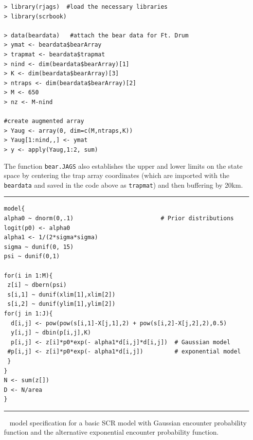 \begin{verbatim}
> library(rjags)  #load the necessary libraries
> library(scrbook)

> data(beardata)   #attach the bear data for Ft. Drum
> ymat <- beardata$bearArray
> trapmat <- beardata$trapmat
> nind <- dim(beardata$bearArray)[1]
> K <- dim(beardata$bearArray)[3]
> ntraps <- dim(beardata$bearArray)[2]
> M <- 650
> nz <- M-nind

#create augmented array
> Yaug <- array(0, dim=c(M,ntraps,K))
> Yaug[1:nind,,] <- ymat
> y <- apply(Yaug,1:2, sum)
\end{verbatim}


The function {\tt bear.JAGS} also establishes the upper 
and lower limits on the state space by centering the trap
array coordinates (which are imported with the {\tt beardata}
and saved in the code above as {\tt trapmat}) and then buffering by 20km.  


\begin{panel}[htp]
\centering
\rule[0.1in]{\textwidth}{.03in}
{\small
\begin{verbatim}
model{
alpha0 ~ dnorm(0,.1)                         # Prior distributions
logit(p0) <- alpha0
alpha1 <- 1/(2*sigma*sigma)
sigma ~ dunif(0, 15)
psi ~ dunif(0,1)

for(i in 1:M){
 z[i] ~ dbern(psi)
 s[i,1] ~ dunif(xlim[1],xlim[2])
 s[i,2] ~ dunif(ylim[1],ylim[2])
for(j in 1:J){
  d[i,j] <- pow(pow(s[i,1]-X[j,1],2) + pow(s[i,2]-X[j,2],2),0.5)
  y[i,j] ~ dbin(p[i,j],K)
  p[i,j] <- z[i]*p0*exp(- alpha1*d[i,j]*d[i,j])  # Gaussian model
 #p[i,j] <- z[i]*p0*exp(- alpha1*d[i,j])         # exponential model
 }
}
N <- sum(z[])
D <- N/area
}
\end{verbatim}
}
\rule[-0.1in]{\textwidth}{.03in}
\caption{
\jags~ model specification for a basic SCR model with Gaussian
encounter probability function and the alternative exponential encounter probability function.}
\label{covariates.panel.basicSCR}
\end{panel}

